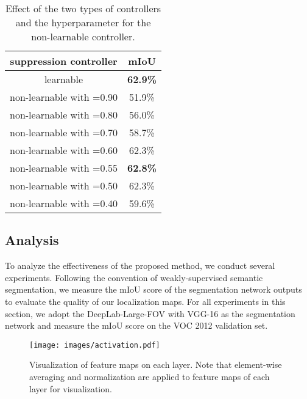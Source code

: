 \documentclass[letterpaper]{article} \usepackage{aaai21}  \usepackage{times}  \usepackage{helvet} \usepackage{courier}  \usepackage[hyphens]{url}  \usepackage{graphicx} \urlstyle{rm} \def\UrlFont{\rm}  \usepackage{natbib}  \usepackage{caption} \frenchspacing  \setlength{\pdfpagewidth}{8.5in}  \setlength{\pdfpageheight}{11in}
\begin{document}
\begin{table}[t]
  \centering
  \begin{adjustbox}{max width=\linewidth}
            \begin{tabular}{c|c}
            \hline
            suppression controller & mIoU \\
            \hline
            learnable & \textbf{62.9\%} \\
            non-learnable with =0.90 & 51.9\% \\
            non-learnable with =0.80 & 56.0\% \\
            non-learnable with =0.70 & 58.7\% \\
            non-learnable with =0.60 & 62.3\% \\
            non-learnable with =0.55 & \textbf{62.8\%} \\
            non-learnable with =0.50 & 62.3\% \\
            non-learnable with =0.40 & 59.6\% \\
            \hline
          \end{tabular}
  \end{adjustbox}
  \caption{
    Effect of the two types of controllers and the hyperparameter  for the non-learnable controller.
  }
  \label{tab:controller}
\end{table}


\subsection{Analysis}
To analyze the effectiveness of the proposed method, we conduct several experiments.
Following the convention of weakly-supervised semantic segmentation, we measure the mIoU score of the segmentation network outputs to evaluate the quality of our localization maps.
For all experiments in this section, we adopt the DeepLab-Large-FOV with VGG-16 as the segmentation network and measure the mIoU score on the VOC 2012 validation set.



\begin{figure}[t]
    \centering
    \texttt{[image: images/activation.pdf]}
    \caption{
        Visualization of feature maps on each layer. Note that element-wise averaging and normalization are applied to feature maps of each layer for visualization. 
    }
    \label{figure:activation}
\end{figure}
\end{document}
